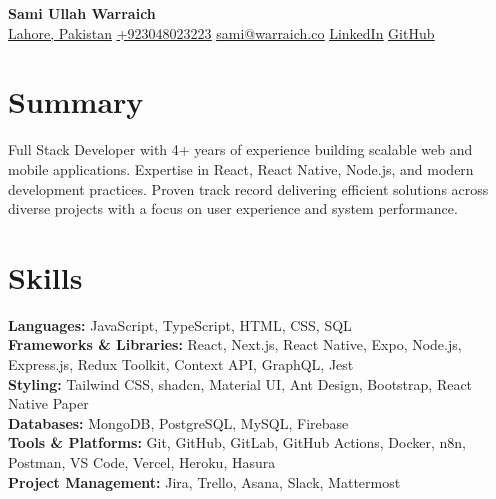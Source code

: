 \documentclass[letterpaper,11pt]{article}
\begin{document}
\noindent
\begin{minipage}[c]{1.0\textwidth} %
  \centering
  \textbf{\Huge Sami Ullah Warraich} \\[6pt]
  \underline{Lahore, Pakistan} \textbar{}
  \href{https://wa.me/+923048023223}{\underline{+923048023223}} \textbar{}
  \href{mailto:sami@warraich.co}{\underline{sami@warraich.co}} \textbar{}
  \href{https://linkedin.com/in/samiwarra1ch}{\underline{LinkedIn}} \textbar{} 
  \href{https://github.com/samiwarraich}{\underline{GitHub}}
\end{minipage}%



\section{Summary}
\begin{itemize}[leftmargin=0.15in, label={}]
  \small{\item{
    Full Stack Developer with 4+ years of experience building scalable web and mobile applications. Expertise in React, React Native, Node.js, and modern development practices. Proven track record delivering efficient solutions across diverse projects with a focus on user experience and system performance.
  }}
\end{itemize}

\section{Skills}
\begin{itemize}[leftmargin=0.15in, label={}]
  \small{\item{
    \textbf{Languages:} JavaScript, TypeScript, HTML, CSS, SQL \\
    \textbf{Frameworks \& Libraries:} React, Next.js, React Native, Expo, Node.js, Express.js, Redux Toolkit, Context API, GraphQL, Jest \\
    \textbf{Styling:} Tailwind CSS, shadcn, Material UI, Ant Design, Bootstrap, React Native Paper \\
    \textbf{Databases:} MongoDB, PostgreSQL, MySQL, Firebase \\
    \textbf{Tools \& Platforms:} Git, GitHub, GitLab, GitHub Actions, Docker, n8n, Postman, VS Code, Vercel, Heroku, Hasura \\
    \textbf{Project Management:} Jira, Trello, Asana, Slack, Mattermost
  }}
\end{itemize}
\end{document}
